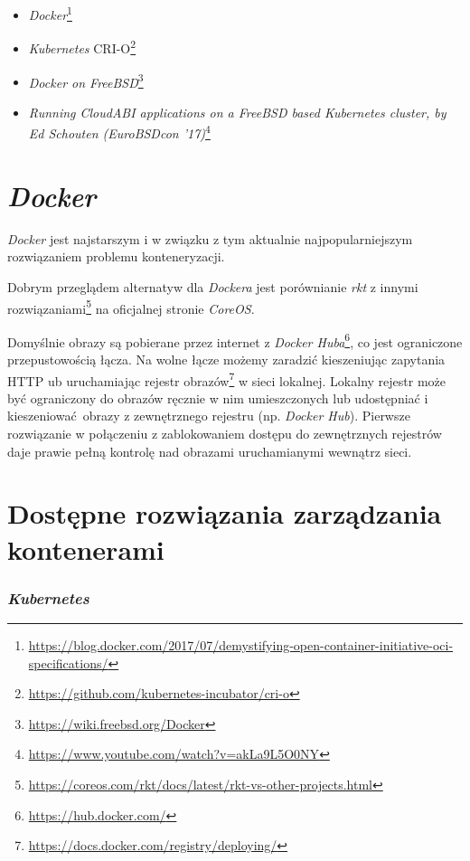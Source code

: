 \documentclass[a4paper,12pt,twoside,openany]{report}
\providecommand{\tightlist}{%
  \setlength{\itemsep}{0pt}\setlength{\parskip}{0pt}}
\DeclareRobustCommand{\href}[2]{#2\footnote{\url{#1}}}
\begin{document}
\begin{itemize}
\tightlist
\item
  \href{https://blog.docker.com/2017/07/demystifying-open-container-initiative-oci-specifications/}{\emph{Docker}}
\item
  \href{https://github.com/kubernetes-incubator/cri-o}{\emph{Kubernetes}
  CRI-O}
\item
  \href{https://wiki.freebsd.org/Docker}{\emph{Docker on FreeBSD}}
\item
  \href{https://www.youtube.com/watch?v=akLa9L5O0NY}{\emph{Running
  CloudABI applications on a FreeBSD based Kubernetes cluster, by Ed
  Schouten (EuroBSDcon '17)}}
\end{itemize}

\hypertarget{docker}{%
\section{\texorpdfstring{\emph{Docker}}{Docker}}\label{docker}}

\emph{Docker} jest najstarszym i w związku z tym aktualnie
najpopularniejszym rozwiązaniem problemu konteneryzacji.

Dobrym przeglądem alternatyw dla \emph{Dockera} jest
\href{https://coreos.com/rkt/docs/latest/rkt-vs-other-projects.html}{porównianie
\emph{rkt} z innymi rozwiązaniami} na oficjalnej stronie \emph{CoreOS}.

Domyślnie obrazy są pobierane przez internet z
\href{https://hub.docker.com/}{\emph{Docker Huba}}, co jest ograniczone
przepustowością łącza. Na wolne łącze możemy zaradzić kieszeniując
zapytania HTTP ub uruchamiając
\href{https://docs.docker.com/registry/deploying/}{rejestr obrazów} w
sieci lokalnej. Lokalny rejestr może być ograniczony do obrazów ręcznie
w nim umieszczonych lub udostępniać i kieszeniować~obrazy z zewnętrznego
rejestru (np. \emph{Docker Hub}). Pierwsze rozwiązanie w połączeniu z
zablokowaniem dostępu do zewnętrznych rejestrów daje prawie pełną
kontrolę nad obrazami uruchamianymi wewnątrz sieci.

\hypertarget{dostux119pne-rozwiux105zania-zarzux105dzania-kontenerami}{%
\section{Dostępne rozwiązania zarządzania
kontenerami}\label{dostux119pne-rozwiux105zania-zarzux105dzania-kontenerami}}

\hypertarget{kubernetes}{%
\subsubsection{\texorpdfstring{\emph{Kubernetes}}{Kubernetes}}\label{kubernetes}}
\end{document}
